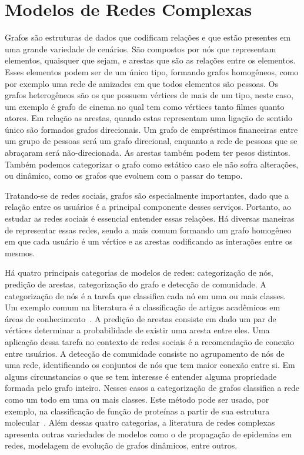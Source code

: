 \chapter{Modelos de Redes Complexas}
\label{chapter:networks}

Grafos são estruturas de dados que codificam relações e que estão presentes em
uma grande variedade de cenários.
São compostos por nós que representam elementos, quaisquer que sejam, e arestas
que são as relações entre os elementos.
Esses elementos podem ser de um único tipo, formando grafos homogêneos, como por
exemplo uma rede de amizades em que todos elementos são pessoas.
Os grafos heterogêneos são os que possuem vértices de mais de um tipo, neste
caso, um exemplo é grafo de cinema no qual tem como vértices tanto filmes quanto
atores.
Em relação as arestas, quando estas representam uma ligação de sentido único são
formados grafos direcionais.
Um grafo de empréstimos financeiras entre um grupo de pessoas será um grafo
direcional, enquanto a rede de pessoas que se abraçaram será não-direcionada.
As arestas também podem ter pesos distintos.
Também podemos categorizar o grafo como estático caso ele não sofra alterações,
ou dinâmico, como os grafos que evoluem com o passar do tempo.

Tratando-se de redes sociais, grafos são especialmente importantes, dado que
a relação entre os usuários é a principal componente desses serviços.
Portanto, ao estudar as redes sociais é essencial entender essas relações.
Há diversas maneiras de representar essas redes, sendo a mais comum formando um
grafo homogêneo em que cada usuário é um vértice e as arestas codificando as
interações entre os mesmos.

Há quatro principais categorias de modelos de redes: categorização de nós, predição
de arestas, categorização do grafo e detecção de comunidade.
A categorização de nós é a tarefa que classifica cada nó em uma ou mais classes.
Um exemplo comum na literatura é a classificação de artigos acadêmicos em áreas
de conhecimento~\cite{sen08}.
A predição de arestas consiste em dado um par de vértices determinar a
probabilidade de existir uma aresta entre eles. Uma aplicação dessa tarefa no
contexto de redes sociais é a recomendação de conexão entre usuários.
A detecção de comunidade consiste no agrupamento de nós de uma rede,
identificando os conjuntos de nós que tem maior conexão entre si.
Em alguns circunstancias o que se tem interesse é entender alguma propriedade
formada pelo grafo inteiro.
Nesses casos a categorização de grafos classifica a rede como um todo em uma ou
mais classes.
Este método pode ser usado, por exemplo, na classificação de função de
proteínas a partir de sua estrutura molecular~\cite{shervashidze11}.
Além dessas quatro categorias, a literatura de redes complexas apresenta outras
variedades de modelos como o de propagação de epidemias em redes, modelagem de
evolução de grafos dinâmicos, entre outros.

